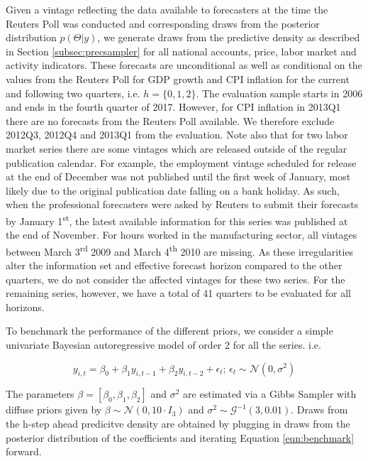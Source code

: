 \documentclass[notitlepage,a4paper,12pt]{article}
\begin{document}
Given a vintage reflecting the data available to forecasters at the time the Reuters Poll was conducted and corresponding draws from the posterior distribution $p(\Theta|y)$, we generate draws from the predictive density as described in Section \ref{subsec:precsampler} for all national accounts, price, labor market and activity indicators. These forecasts are unconditional as well as conditional on the values from the Reuters Poll for GDP growth and CPI inflation for the current and following two quarters, i.e. $h=\{0, 1, 2\}$. The evaluation sample starts in 2006 and ends in the fourth quarter of 2017. However, for CPI inflation in 2013Q1 there are no forecasts from the Reuters Poll available. We therefore exclude 2012Q3, 2012Q4 and 2013Q1 from the evaluation. Note also that for two labor market series there are some vintages which are released outside of the regular publication calendar. For example, the employment vintage scheduled for release at the end of December was not published until the first week of January, most likely due to the original publication date falling on a bank holiday. As such, when the professional forecasters were asked by Reuters to submit their forecasts by January 1\textsuperscript{st}, the latest available information for this series was published at the end of November. For hours worked in the manufacturing sector, all vintages between March 3\textsuperscript{rd} 2009 and March 4\textsuperscript{th} 2010 are missing. As these irregularities alter the information set and effective forecast horizon compared to the other quarters, we do not consider the affected vintages for these two series. For the remaining series, however, we have a total of 41 quarters to be evaluated for all horizons.

To benchmark the performance of the different priors, we consider a simple univariate Bayesian autoregressive model of order 2 for all the series.  i.e. 

\begin{equation}\label{eqn:benchmark}
y_{i,t} = \beta_0 + \beta_1 y_{i,t-1} + \beta_2 y_{i,t-2} + \epsilon_t; \, \epsilon_t \sim \mathcal{N}(0, \sigma^2)
\end{equation}

The parameters $\beta = [\beta_0, \beta_1, \beta_2]$  and $\sigma^2$ are estimated via a Gibbs Sampler with diffuse priors given by $\beta \sim \mathcal{N}(0,10 \cdot I_3)$  and $\sigma^2 \sim \mathcal{G}^{-1}(3,0.01)$. Draws from the h-step ahead predicitve density are obtained by plugging in draws from the posterior distribution of the coefficients and iterating Equation \ref{eqn:benchmark} forward.
\end{document}
